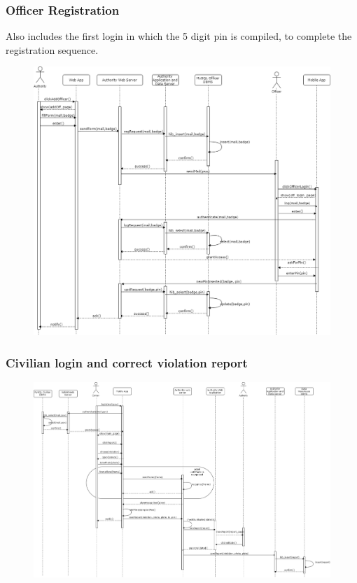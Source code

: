 \documentclass[12pt,a4paper]{article}
\begin{document}
		\subsubsection{Officer Registration}
Also includes the first login in which the 5 digit pin is compiled, to complete the registration sequence.
			\begin{figure}[H]
				\centering
				\includegraphics[width=1.1\textwidth,height=1.1\textheight,keepaspectratio]{Images/Off_registration}
				\label{fig:login_sequence}
			\end{figure}
\newpage
		\subsubsection{Civilian login and correct violation report}
			\begin{figure}[H]
\begin{adjustwidth}{-25mm}{-25mm}
				\centering
				\includegraphics[width=0.9\paperwidth,keepaspectratio]{Images/Civilian_report}
\end{adjustwidth}
			\end{figure}
\end{document}
